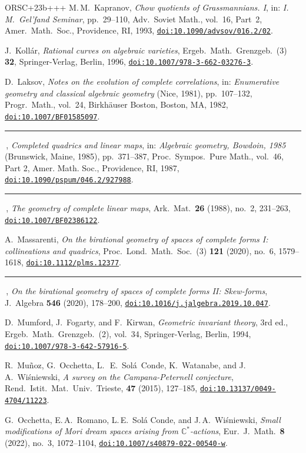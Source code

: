 \documentclass[10pt,a4paper]{article}
\numberwithin{equation}{section}
\theoremstyle{definition}
\theoremstyle{remark}
\providecommand{\etalchar}[1]{#1}
\providecommand{\bysame}{\rule[.5ex]{3em}{.3pt}\,}
\providecommand{\doi}[2][]{\href{https://doi.org/#2}{\nolinkurl{doi:#2}}}
\begin{document}
\begin{thebibliography}{ORSC\etalchar{+}23b+++}
M.\,M.~Kapranov, 
\emph{Chow quotients of Grassmannians. {I}},
in: \emph{I.\,{M}.~{G}el'fand {S}eminar},  pp.~29--110,  Adv.\ Soviet
Math., vol.~16, Part~2,
Amer.\ Math.\ Soc., Providence, RI, 1993,
\doi{10.1090/advsov/016.2/02}.

J.~Koll{\'a}r, 
\emph{Rational curves on algebraic varieties},
Ergeb.\ Math.\ Grenzgeb.\ (3) \textbf{32}, Springer-Verlag, Berlin, 1996, 
  \doi{10.1007/978-3-662-03276-3}. 

D.~Laksov, 
\emph{Notes on the evolution of complete correlations}, 
in: \emph{Enumerative geometry and classical algebraic geometry}
  ({N}ice, 1981), pp.~107--132, Progr.\ Math., vol.~24, 
Birkh\"auser Boston, Boston, MA, 1982,
\doi{10.1007/BF01585097}.

\bysame,
\emph{Completed quadrics and linear maps}, 
 in: \emph{Algebraic geometry, {B}owdoin, 1985} ({B}runswick, {M}aine,
  1985), pp.~371--387, Proc.\ Sympos.\ Pure Math., vol.~46, Part 2,
  Amer. Math. Soc., Providence, RI, 1987,
  \doi{10.1090/pspum/046.2/927988}.

\bysame, 
\emph{The geometry of complete linear maps}, 
Ark.\ Mat.\  \textbf{26} (1988), no.~2, 231--263,
\doi{10.1007/BF02386122}.

A.~Massarenti, 
\emph{On the birational geometry of spaces of complete forms {I}:
  collineations and quadrics}, 
Proc.\ Lond.\ Math.\ Soc.~(3) \textbf{121} (2020), no.~6, 1579--1618,
\doi{10.1112/plms.12377}.

\bysame,
\emph{On the birational geometry of spaces of complete forms {II}:
  {S}kew-forms}, 
J.~Algebra \textbf{546} (2020), 178--200,
\doi{10.1016/j.jalgebra.2019.10.047}.

D.~Mumford, J.~Fogarty, and F.~Kirwan, 
\emph{Geometric invariant theory}, 3rd ed., Ergeb.\ Math.\ Grenzgeb.~(2), 
vol.~34,  Springer-Verlag, Berlin, 1994,
\doi{10.1007/978-3-642-57916-5}.

\bibitem[MOSW\etalchar{+}15]{MOSWW}
R.~Mu{\~n}oz, G.~Occhetta, L.\,~E.~Sol{\'a}~Conde, K.~Watanabe,
  and J.\,A.~Wi\'sniewski, 
\emph{A survey on the Campana-Peternell conjecture}, 
Rend.\ Istit.\ Mat.\ Univ.\ Trieste, \textbf{47} (2015), 127--185,
\doi{10.13137/0049-4704/11223}.

 G.~Occhetta, E.\,A.~Romano, L.\,E.~Sol\'a Conde, and J.\,A.~Wi\'sniewski, 
\emph{Small modifications of Mori dream spaces arising from
  {$\mathbb{C}^*$}-actions}, 
Eur.~J.\ Math.\ \textbf{8} (2022), no.~3, 1072--1104,
\doi{10.1007/s40879-022-00540-w}.




\end{thebibliography}
\end{document}
